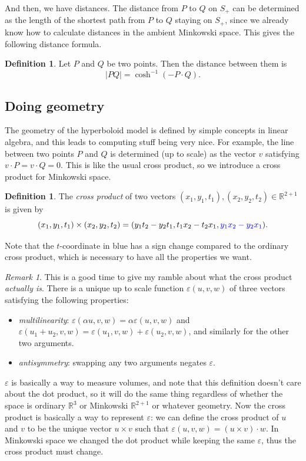 \documentclass{article}
\theoremstyle{definition}
\newtheorem{defn}[thm]{Definition}
\theoremstyle{remark}
\newtheorem*{rmk}{Remark}
\begin{document}
And then, we have distances. The distance from $P$ to $Q$ on $S_+$ can be determined as the length of the shortest path from $P$ to $Q$ staying on $S_+$, since we already know how to calculate distances in the ambient Minkowski space. This gives the following distance formula.
\begin{defn}
    Let $P$ and $Q$ be two points. Then the distance between them is
    \[\vert PQ\vert=\cosh^{-1}(-P\cdot Q).\]
\end{defn}

\subsection{Doing geometry}
The geometry of the hyperboloid model is defined by simple concepts in linear algebra, and this leads to computing stuff being very nice. For example, the line between two points $P$ and $Q$ is determined (up to scale) as the vector $v$ satisfying $v\cdot P=v\cdot Q=0$. This is like the usual cross product, so we introduce a cross product for Minkowski space.
\begin{defn}
    The \emph{cross product} of two vectors $(x_1,y_1,t_1),(x_2,y_2,t_2)\in\mathbb R^{2+1}$ is given by
    \[(x_1,y_1,t_1)\times(x_2,y_2,t_2)=(y_1t_2-y_2t_1,t_1x_2-t_2x_1,{\color{blue}y_1x_2-y_2x_1}).\]
\end{defn}
Note that the $t$-coordinate in {\color{blue}blue} has a sign change compared to the ordinary cross product, which is necessary to have all the properties we want.
\begin{rmk}
    This is a good time to give my ramble about what the cross product \emph{actually is}. There is a unique up to scale function $\varepsilon(u,v,w)$ of three vectors satisfying the following properties:
    \begin{itemize}
        \item \emph{multilinearity}: $\varepsilon(\alpha u,v,w)=\alpha\varepsilon(u,v,w)$ and $\varepsilon(u_1+u_2,v,w)=\varepsilon(u_1,v,w)+\varepsilon(u_2,v,w)$, and similarly for the other two arguments.
        \item \emph{antisymmetry}: swapping any two arguments negates $\varepsilon$.
    \end{itemize}

    $\varepsilon$ is basically a way to measure volumes, and note that this definition doesn't care about the dot product, so it will do the same thing regardless of whether the space is ordinary $\mathbb R^3$ or Minkowski $\mathbb R^{2+1}$ or whatever geometry. Now the cross product is basically a way to represent $\varepsilon$: we can define the cross product of $u$ and $v$ to be the unique vector $u\times v$ such that $\varepsilon(u,v,w)=(u\times v)\cdot w$. In Minkowski space we changed the dot product while keeping the same $\varepsilon$, thus the cross product must change.
\end{rmk}
\end{document}
